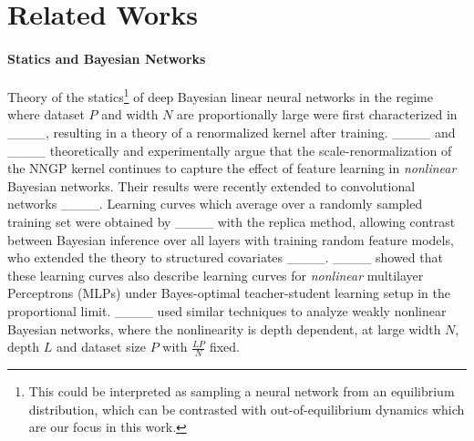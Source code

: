 \section{Related Works}
\label{sec:related_works}
\vspace{-5pt}
\paragraph{Statics and Bayesian Networks} Theory of the statics\footnote{ This could be interpreted as sampling a neural network from an equilibrium distribution, which can be contrasted with out-of-equilibrium dynamics which are our focus in this work. } of deep Bayesian linear neural networks in the regime where dataset $P$ and width $N$ are proportionally large were first characterized in ____, resulting in a theory of a renormalized kernel after training. ____ and ____ theoretically and experimentally argue that the scale-renormalization of the NNGP kernel continues to capture the effect of feature learning in \textit{nonlinear} Bayesian networks. Their results were recently extended to convolutional networks ____. Learning curves which average over a randomly sampled training set were obtained by ____ with the replica method, allowing contrast between Bayesian inference over all layers with training random feature models, who extended the theory to structured covariates ____. ____ showed that these learning curves also describe learning curves for \textit{nonlinear} multilayer Perceptrons (MLPs) under Bayes-optimal teacher-student learning setup in the proportional limit. ____ used similar techniques to analyze weakly nonlinear Bayesian networks, where the nonlinearity is depth dependent, at large width $N$, depth $L$ and dataset size $P$ with $\frac{L P}{N}$ fixed.

\vspace{-10pt}
